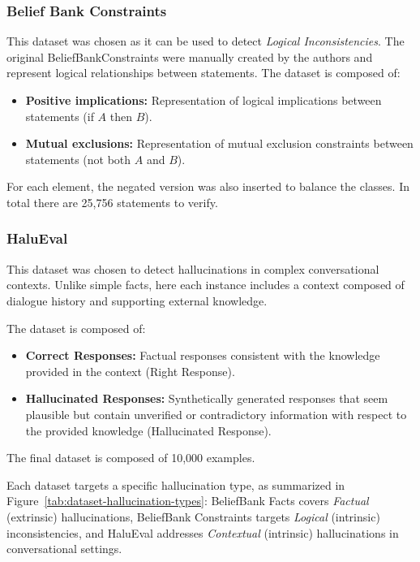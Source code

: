\subsubsection{Belief Bank Constraints}
This dataset was chosen as it can be used to detect \textit{Logical Inconsistencies}.
The original BeliefBankConstraints were manually created by the authors and represent logical relationships between statements. 
The dataset is composed of:
\begin{itemize}
    \item \textbf{Positive implications:} Representation of logical implications between statements (if $A$ then $B$).
    \item \textbf{Mutual exclusions:} Representation of mutual exclusion constraints between statements (not both $A$ and $B$).
\end{itemize}
For each element, the negated version was also inserted to balance the classes. In total there are 25,756 statements to verify.

\subsubsection{HaluEval} This dataset was chosen to detect hallucinations in complex conversational contexts. Unlike simple facts, here each instance includes a context composed of dialogue history and supporting external knowledge.

The dataset is composed of: 
\begin{itemize} 
    \item \textbf{Correct Responses:} Factual responses consistent with the knowledge provided in the context (Right Response). 
    \item \textbf{Hallucinated Responses:} Synthetically generated responses that seem plausible but contain unverified or contradictory information with respect to the provided knowledge (Hallucinated Response). 
\end{itemize}
The final dataset is composed of 10,000 examples.\newline



\medskip



Each dataset targets a specific hallucination type, as summarized in Figure~\ref{tab:dataset-hallucination-types}: BeliefBank Facts covers \textit{Factual} (extrinsic) hallucinations, BeliefBank Constraints targets \textit{Logical} (intrinsic) inconsistencies, and HaluEval addresses \textit{Contextual} (intrinsic) hallucinations in conversational settings.

